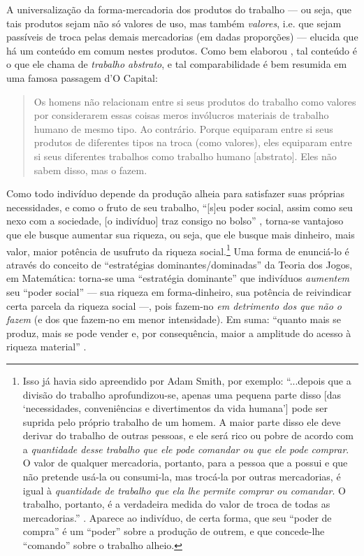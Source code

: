 \documentclass[12pt]{article}
\numberwithin{equation}{section}
\theoremstyle{plain}
\theoremstyle{definition}
\theoremstyle{remark}
\begin{document}
A universalização da forma-mercadoria dos produtos do trabalho --- ou seja, que tais produtos sejam não só valores de uso, mas também \textit{valores}, i.e. que sejam passíveis de troca pelas demais mercadorias (em dadas proporções) --- elucida que há um conteúdo em comum nestes produtos. Como bem elaborou \textcite{Marx2017}, tal conteúdo é o que ele chama de \textit{trabalho abstrato}, e tal comparabilidade é bem resumida em uma famosa passagem d'O Capital:
\begin{quote}
    Os homens não relacionam entre si seus produtos do trabalho como valores por considerarem essas coisas meros invólucros materiais de trabalho humano de mesmo tipo. Ao contrário. Porque equiparam entre si seus produtos de diferentes tipos na troca (como valores), eles equiparam entre si seus diferentes trabalhos como trabalho humano [abstrato]. Eles não sabem disso, mas o fazem. \parencite[p. 149]{Marx2017}
\end{quote}

Como todo indivíduo depende da produção alheia para satisfazer suas próprias necessidades, e como o fruto de seu trabalho, ``[s]eu poder social, assim como seu nexo com a sociedade, [o indivíduo] traz consigo no bolso'' \parencite[p. 105]{Marx2011}, torna-se vantajoso que ele busque aumentar sua riqueza, ou seja, que ele busque mais dinheiro, mais valor, maior potência de usufruto da riqueza social.\footnote{Isso já havia sido apreendido por Adam Smith, por exemplo: ``...depois que a divisão do trabalho aprofundizou-se, apenas uma pequena parte disso [das `necessidades, conveniências e divertimentos da vida humana'] pode ser suprida pelo próprio trabalho de um homem. A maior parte disso ele deve derivar do trabalho de outras pessoas, e ele será rico ou pobre de acordo com a \textit{quantidade desse trabalho que ele pode comandar ou que ele pode comprar}. O valor de qualquer mercadoria, portanto, para a pessoa que a possui e que não pretende usá-la ou consumi-la, mas trocá-la por outras mercadorias, é igual à \textit{quantidade de trabalho que ela lhe permite comprar ou comandar}. O trabalho, portanto, é a verdadeira medida do valor de troca de todas as mercadorias.'' \parencite[p. 54, grifo meu]{Smith1904}. Aparece ao indivíduo, de certa forma, que seu ``poder de compra'' é um ``poder'' sobre a produção de outrem, e que concede-lhe ``comando'' sobre o trabalho alheio.} Uma forma de enunciá-lo é através do conceito de ``estratégias dominantes/dominadas'' da Teoria dos Jogos, em Matemática: torna-se uma ``estratégia dominante'' que indivíduos \textit{aumentem} seu ``poder social'' --- sua riqueza em forma-dinheiro, sua potência de reivindicar certa parcela da riqueza social ---, pois fazem-no \textit{em detrimento dos que não o fazem} (e dos que fazem-no em menor intensidade). Em suma: ``quanto mais se produz, mais se pode vender e, por consequência, maior a amplitude do acesso à riqueza material'' \parencite[p. 43]{SaBarreto2022}. 
\end{document}
